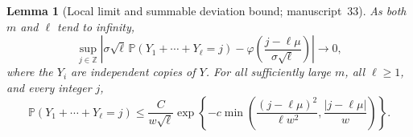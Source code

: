 \documentclass[11pt,a4paper]{article}
\newtheorem{lemma}[lemma]{Lemma}
\theoremstyle{definition}\newaliascnt{definition}{theorem}
\theoremstyle{remark}\newaliascnt{remark}{theorem}
\newcommand{\ljP}{\mathbb P}
\begin{document}
\begin{lemma}[Local limit and summable deviation bound; manuscript~33]
\label{jg:ra:lem:local}
As both $m$ and $\ell$ tend to infinity,
\begin{equation}\label{jg:ra:eq:llt}
 \sup_{j\in\mathbb Z}
 \left|\sigma\sqrt\ell\,\ljP(Y_1+\cdots+Y_\ell=j)
 -\varphi\!\left(\frac{j-\ell\mu}{\sigma\sqrt\ell}\right)\right|
 \longrightarrow0,
\end{equation}
where the $Y_i$ are independent copies of $Y$. For all sufficiently large $m$,
all $\ell\ge1$, and every integer $j$,
\begin{equation}\label{jg:ra:eq:pointwise}
 \ljP(Y_1+\cdots+Y_\ell=j)
 \le\frac{C}{w\sqrt\ell}
  \exp\!\left\{-c\min\left(
    \frac{(j-\ell\mu)^2}{\ell w^2},
    \frac{|j-\ell\mu|}{w}\right)\right\}.
\end{equation}
\end{lemma}
\end{document}
